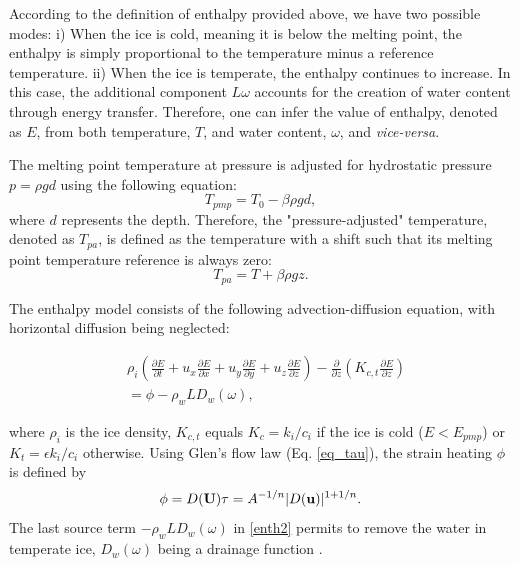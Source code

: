 \documentclass[10pt,twocolumn]{article}
\begin{document}
According to the definition of enthalpy provided above, we have two possible modes:
i) When the ice is cold, meaning it is below the melting point, the enthalpy is simply 
proportional to the temperature minus a reference temperature.
ii) When the ice is temperate, the enthalpy continues to increase. In this case, 
the additional component $L \omega$ accounts for the creation of water content 
through energy transfer. Therefore, one can infer the value of enthalpy, denoted as $E$, 
from both temperature, $T$, and water content, $\omega$, and \textit{vice-versa}.

The melting point temperature at pressure is adjusted for hydrostatic pressure 
$p = \rho g d$ using the following equation:
\begin{equation}
\label{Tpmp}
T_{pmp} = T_{0} - \beta \rho g d, 
\end{equation}
where $d$ represents the depth. Therefore, the "pressure-adjusted" temperature, 
denoted as $T_{pa}$, is defined as the temperature with a shift such that its 
melting point temperature reference is always zero:
$$ T_{pa} = T + \beta \rho g z. $$

The enthalpy model consists of the following advection-diffusion equation,
with horizontal diffusion being neglected:

\begin{align}
& \rho_i \left( \frac{\partial E}{ \partial t}
+ u_x \frac{\partial E}{ \partial x}
+ u_y \frac{\partial E}{ \partial y} 
+ u_z \frac{\partial E}{ \partial z} 
\right) 
 - \frac{\partial }{\partial z} \left(
K_{c,t} \frac{\partial E}{ \partial z} \right) \label{enth1} \\
& = \phi - \rho_w L D_w(\omega), \label{enth2} 
\end{align}

where $\rho_i$ is the ice density, $K_{c,t}$ equals 
$K_c = k_i/c_i$ if the ice is cold ($E<E_{pmp}$) or $K_t = \epsilon k_i/c_i$ otherwise. 
Using Glen's flow law (Eq. \eqref{eq_tau}), the strain heating $\phi$ is defined by 
\begin{equation}
\label{def_phi}
\phi = D({\bf U}) \tau = A^{-1/n} | D({\bf u}) |^{1+1/n}.
\end{equation}
The last source term $- \rho_w L D_w(\omega)$ in \eqref{enth2} permits to remove the water 
in temperate ice, $D_w(\omega)$ being a drainage function \citep{aschwanden2012enthalpy}.
\end{document}
